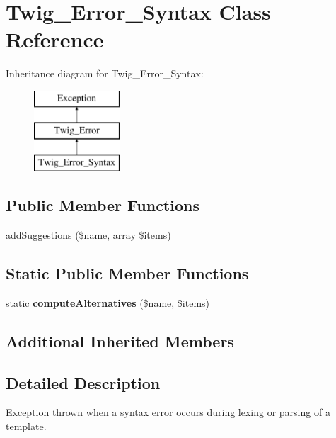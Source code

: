 \hypertarget{classTwig__Error__Syntax}{}\section{Twig\+\_\+\+Error\+\_\+\+Syntax Class Reference}
\label{classTwig__Error__Syntax}
Inheritance diagram for Twig\+\_\+\+Error\+\_\+\+Syntax\+:\begin{figure}[H]
\begin{center}
\leavevmode
\includegraphics[height=3.000000cm]{classTwig__Error__Syntax}
\end{center}
\end{figure}
\subsection*{Public Member Functions}
\begin{DoxyCompactItemize}
\item 
\hyperlink{classTwig__Error__Syntax_a12990bf0f6bb6cbe4373e971c8d214df}{add\+Suggestions} (\$name, array \$items)
\end{DoxyCompactItemize}
\subsection*{Static Public Member Functions}
\begin{DoxyCompactItemize}
\item 
static {\bfseries compute\+Alternatives} (\$name, \$items)\hypertarget{classTwig__Error__Syntax_a5f55a67cd26c06eebe4dcd0904a58fc8}{}\label{classTwig__Error__Syntax_a5f55a67cd26c06eebe4dcd0904a58fc8}

\end{DoxyCompactItemize}
\subsection*{Additional Inherited Members}


\subsection{Detailed Description}
Exception thrown when a syntax error occurs during lexing or parsing of a template.

